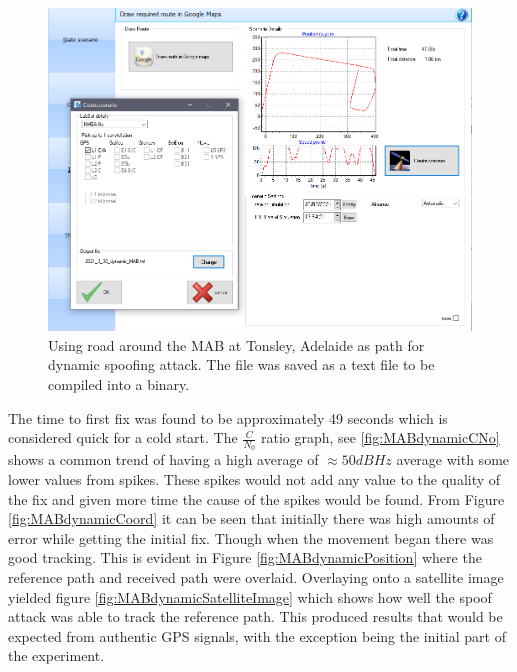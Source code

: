 \begin{figure}[H]
    \begin{centering}
        \includegraphics[width=14cm,keepaspectratio]{Figures/2021_3_30_dynamic_MAB_setup.png}
        \caption{Using road around the MAB at Tonsley, Adelaide as path for dynamic spoofing attack. The file was saved as a text file to be compiled into a binary.}
        \label{fig:MABdynamicSetup}
    \end{centering}
\end{figure}

The time to first fix was found to be approximately 49 seconds which is considered quick for a cold start. The $\frac{C}{N_0}$ ratio graph, see \ref{fig:MABdynamicCNo} shows a common trend of having
a high average of $\approx 50dBHz$ average with some lower values from spikes. These spikes would not add any value to the quality of the fix and given more time the
cause of the spikes would be found. From Figure \ref{fig:MABdynamicCoord} it can be seen that initially there was high amounts of error while getting the initial fix.
Though when the movement began there was good tracking. This is evident in Figure \ref{fig:MABdynamicPosition} where the reference path and received path were overlaid.
Overlaying onto a satellite image yielded figure \ref{fig:MABdynamicSatelliteImage} which shows how well the spoof attack was able to track the reference path. This produced
results that would be expected from authentic GPS signals, with the exception being the initial part of the experiment. 

